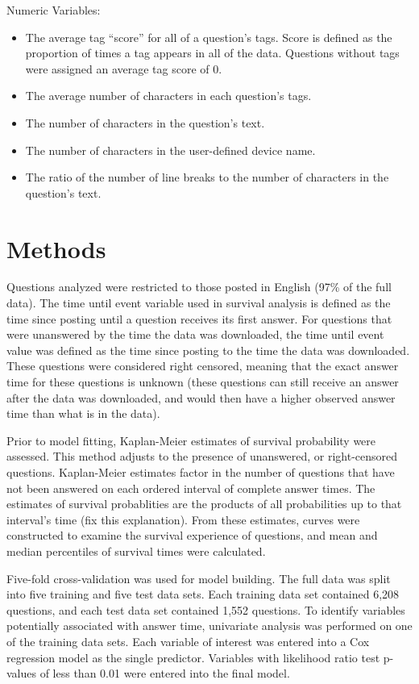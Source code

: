 \documentclass[12pt]{article}
\begin{document}
Numeric Variables:

\begin{itemize}
  \item The average tag ``score'' for all of a question's tags. Score is defined as the proportion of times a tag appears in all of the data. Questions without tags were assigned an average tag score of 0. 
  \item The average number of characters in each question's tags. 
  \item The number of characters in the question's text. 
  \item The number of characters in the user-defined device name. 
  \item The ratio of the number of line breaks to the number of characters in the question's text.
\end{itemize}


\section{Methods}

    Questions analyzed were restricted to those posted in English (97\% of the full data). The time until event variable used in survival analysis is defined as the time since posting until a question receives its first answer. For questions that were unanswered by the time the data was downloaded, the time until event value was defined as the time since posting to the time the data was downloaded. These questions were considered right censored, meaning that the exact answer time for these questions is unknown (these questions can still receive an answer after the data was downloaded, and would then have a higher observed answer time than what is in the data). 

Prior to model fitting, Kaplan-Meier estimates of survival probability were assessed. This method adjusts to the presence of unanswered, or right-censored questions. Kaplan-Meier estimates factor in the number of questions that have not been answered on each ordered interval of complete answer times. The estimates of survival probablities are the products of all probabilities up to that interval's time (fix this explanation). From these estimates, curves were constructed to examine the survival experience of questions, and mean and median percentiles of survival times were calculated. 

Five-fold cross-validation was used for model building. The full data was split into five training and five test data sets. Each training data set contained 6,208 questions, and each test data set contained 1,552 questions. To identify variables potentially associated with answer time, univariate analysis was performed on one of the training data sets. Each variable of interest was entered into a Cox regression model as the single predictor. Variables with likelihood ratio test p-values of less than 0.01 were entered into the final model. 
\end{document}
